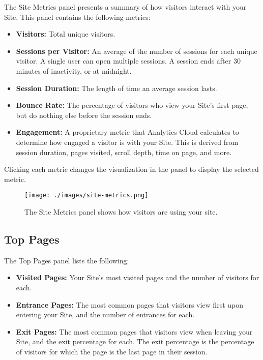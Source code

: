 The Site Metrics panel presents a summary of how visitors interact with
your Site. This panel contains the following metrics:

\begin{itemize}
\tightlist
\item
  \textbf{Visitors:} Total unique visitors.
\item
  \textbf{Sessions per Visitor:} An average of the number of sessions
  for each unique visitor. A single user can open multiple sessions. A
  session ends after 30 minutes of inactivity, or at midnight.
\item
  \textbf{Session Duration:} The length of time an average session
  lasts.
\item
  \textbf{Bounce Rate:} The percentage of visitors who view your Site's
  first page, but do nothing else before the session ends.
\item
  \textbf{Engagement:} A proprietary metric that Analytics Cloud
  calculates to determine how engaged a visitor is with your Site. This
  is derived from session duration, pages visited, scroll depth, time on
  page, and more.
\end{itemize}

Clicking each metric changes the visualization in the panel to display
the selected metric.

\begin{figure}
\centering
\texttt{[image: ./images/site-metrics.png]}
\caption{The Site Metrics panel shows how visitors are using your site.}
\end{figure}

\subsection{Top Pages}\label{top-pages}

The Top Pages panel lists the following:

\begin{itemize}
\tightlist
\item
  \textbf{Visited Pages:} Your Site's most visited pages and the number
  of visitors for each.
\item
  \textbf{Entrance Pages:} The most common pages that visitors view
  first upon entering your Site, and the number of entrances for each.
\item
  \textbf{Exit Pages:} The most common pages that visitors view when
  leaving your Site, and the exit percentage for each. The exit
  percentage is the percentage of visitors for which the page is the
  last page in their session.
\end{itemize}

